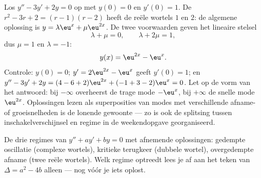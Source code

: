 \begin{example}\label{ex:b1:diffeq:cauchy2}
Los $y'' - 3y' + 2y = 0$ op met $y(0) = 0$ en $y'(0) = 1$. De
 $r^2 - 3r + 2 = (r - 1)(r - 2)$ heeft de
reële wortels $1$ en $2$: de algemene oplossing is $y = \lambda\eu^{x} +
\mu\eu^{2x}$. De twee voorwaarden geven het lineaire stelsel
\[
\lambda + \mu = 0, \qquad \lambda + 2\mu = 1 ,
\]
dus $\mu = 1$ en $\lambda = -1$:
\[
y(x) = \eu^{2x} - \eu^{x} .
\]
Controle: $y(0) = 0$; $y' = 2\eu^{2x} - \eu^x$ geeft $y'(0) = 1$; en $y''
- 3y' + 2y = (4 - 6 + 2)\eu^{2x} + (-1 + 3 - 2)\eu^x = 0$. Let op de
vorm van het antwoord: bij $-\infty$ overheerst de trage mode $-\eu^x$,
bij $+\infty$ de snelle mode $\eu^{2x}$. Oplossingen lezen als
superposities van modes met verschillende afname- of groeisnelheden is de
lonende gewoonte --- zo is ook de splitsing tussen inschakelverschijnsel
en regime in de weekendopgave georganiseerd.
\end{example}

\begin{omfigure}

{\small De drie regimes van $y'' + ay' + by = 0$ met afnemende
oplossingen: gedempte oscillatie (complexe wortels), kritieke terugkeer
(dubbele wortel), overgedempte afname (twee reële wortels). Welk regime
optreedt lees je af aan het teken van $\Delta = a^2 - 4b$ alleen ---
nog vóór je iets oplost.}
\end{omfigure}

